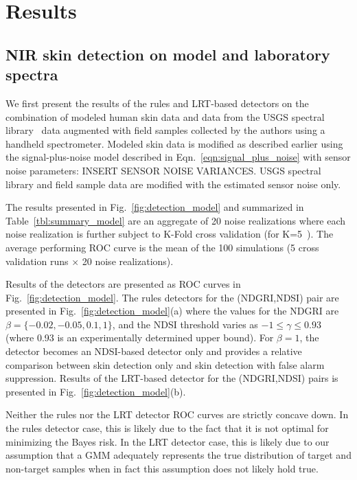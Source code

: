 \documentclass[10pt,journal,cspaper,compsoc]{IEEEtran}
\begin{document}
\section{Results}
\label{scn:results}
\subsection{NIR skin detection on model and laboratory spectra}
\label{scn:results_model}
We first present the results of the rules and LRT-based detectors on the combination of modeled human skin data 
and data from the USGS spectral library~\cite{USGS1} data augmented with field samples collected by the authors using 
a handheld spectrometer. Modeled skin data is modified as described earlier using the signal-plus-noise model described 
in Eqn.~\ref{eqn:signal_plus_noise} with sensor noise parameters: INSERT SENSOR NOISE VARIANCES.  USGS spectral library 
and field sample data are modified with the estimated sensor noise only.

The results presented in Fig.~\ref{fig:detection_model} and summarized in Table~\ref{tbl:summary_model} are an aggregate of 
20 noise realizations where each noise realization is further subject to K-Fold cross validation (for K=5~\cite{hastie01}).  
The average performing ROC curve is the mean of the 100 simulations (5 cross validation runs $\times$ 20 noise realizations).

Results of the detectors are presented as ROC curves in Fig.~\ref{fig:detection_model}.  The rules detectors for the (NDGRI,NDSI) pair 
are presented in Fig.~\ref{fig:detection_model}(a) where the values for the NDGRI are $\beta=\{-0.02, -0.05, 0.1, 1\}$, and the NDSI 
threshold varies as $-1 \leq \gamma \leq 0.93$ (where 0.93 is an experimentally determined upper bound). For $\beta=1$, the detector 
becomes an NDSI-based detector only and provides a relative comparison between skin detection only and skin detection with false alarm 
suppression.
Results of the LRT-based detector for the (NDGRI,NDSI) pairs is presented in Fig.~\ref{fig:detection_model}(b).

Neither the rules nor the LRT detector ROC curves are strictly concave down.  In the rules detector case, 
this is likely due to the fact that it is not optimal for minimizing the Bayes risk.  In the LRT detector case, this is likely due 
to our assumption that a GMM adequately represents the true distribution of target and non-target samples when 
in fact this assumption does not likely hold true.
\end{document}
